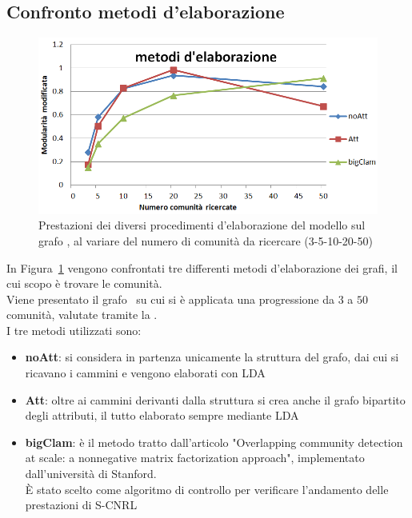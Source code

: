 
%
\subsection{Confronto metodi d'elaborazione}%
%
\begin{figure}[htp]
	\centering
	\includegraphics[width=\linewidth]{immagini/MOD_3_elaborazione}
	\caption{Prestazioni dei diversi procedimenti d'elaborazione del modello sul grafo \cora, al variare del numero di comunità da ricercare (3-5-10-20-50)}
	\label{fig:MOD_3_elaborazione}
\end{figure}
%
In Figura~\ref{fig:MOD_3_elaborazione} vengono confrontati tre differenti metodi d'elaborazione dei grafi, il cui scopo è trovare le comunità.\\
Viene presentato il grafo \cora\ su cui si è applicata una progressione da $3$ a $50$ comunità, valutate tramite la \mmod. \\
I tre metodi utilizzati sono:
\begin{itemize}
	\item \textbf{noAtt}: si considera in partenza unicamente la struttura del grafo, dai cui si ricavano i cammini e vengono elaborati con LDA
	\item \textbf{Att}: oltre ai cammini derivanti dalla struttura si crea anche il grafo bipartito degli attributi, il tutto elaborato sempre mediante LDA
	\item \textbf{bigClam}: è il metodo tratto dall'articolo "Overlapping community detection at scale: a nonnegative matrix factorization approach"\cite{bigClam_paper}, implementato dall'università di Stanford\cite{bigClam_code}.\\
	È stato scelto come algoritmo di controllo per verificare l'andamento delle prestazioni di S-CNRL
\end{itemize}
